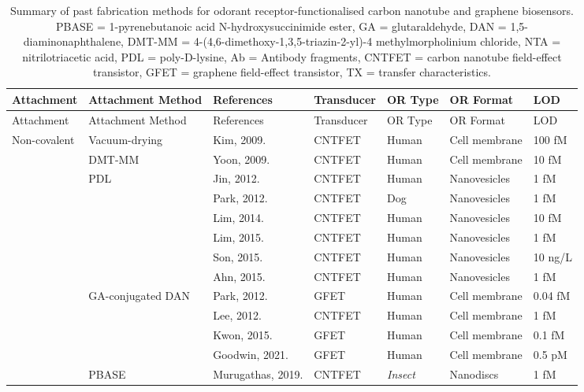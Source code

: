 \documentclass[
  a4paper,
]{scrbook}
\begin{document}
\hypertarget{tbl-or-biosensors}{}
\begin{longtable}[]{@{}lllllll@{}}
\caption{\label{tbl-or-biosensors}Summary of past fabrication methods
for odorant receptor-functionalised carbon nanotube and graphene
biosensors. PBASE = 1-pyrenebutanoic acid N-hydroxysuccinimide ester, GA
= glutaraldehyde, DAN = 1,5-diaminonaphthalene, DMT-MM =
4-(4,6-dimethoxy-1,3,5-triazin-2-yl)-4 methylmorpholinium chloride, NTA
= nitrilotriacetic acid, PDL = poly-D-lysine, Ab = Antibody fragments,
CNTFET = carbon nanotube field-effect transistor, GFET = graphene
field-effect transistor, TX = transfer characteristics.}\tabularnewline
\toprule\noalign{}
Attachment & Attachment Method & References & Transducer & OR Type & OR
Format & LOD \\
\midrule\noalign{}
\endfirsthead
\toprule\noalign{}
Attachment & Attachment Method & References & Transducer & OR Type & OR
Format & LOD \\
\midrule\noalign{}
\endhead
\bottomrule\noalign{}
\endlastfoot
Non-covalent & Vacuum-drying & Kim, 2009. \cite{Kim2009a} & CNTFET &
Human & Cell membrane & 100 fM \\
& DMT-MM & Yoon, 2009. \cite{Yoon2009} & CNTFET & Human & Cell membrane
& 10 fM \\
& PDL & Jin, 2012. \cite{Jin2012} & CNTFET & Human & Nanovesicles & 1
fM \\
& & Park, 2012. \cite{Park2012a} & CNTFET & Dog & Nanovesicles & 1 fM \\
& & Lim, 2014. \cite{Lim2014} & CNTFET & Human & Nanovesicles & 10 fM \\
& & Lim, 2015. \cite{Lim2015} & CNTFET & Human & Nanovesicles & 1 fM \\
& & Son, 2015. \cite{Son2015} & CNTFET & Human & Nanovesicles & 10
ng/L \\
& & Ahn, 2015. \cite{Ahn2015} & CNTFET & Human & Nanovesicles & 1 fM \\
& GA-conjugated DAN & Park, 2012. \cite{Park2012} & GFET & Human & Cell
membrane & 0.04 fM \\
& & Lee, 2012. \cite{Lee2012b} & CNTFET & Human & Cell membrane & 1
fM \\
& & Kwon, 2015. \cite{Kwon2015} & GFET & Human & Cell membrane & 0.1
fM \\
& & Goodwin, 2021. \cite{Goodwin2021} & GFET & Human & Cell membrane &
0.5 pM \\
& PBASE & Murugathas, 2019. \cite{Murugathas2019a} & CNTFET &
\textit{Insect} & Nanodiscs & 1 fM \\

\end{longtable}
\end{document}
